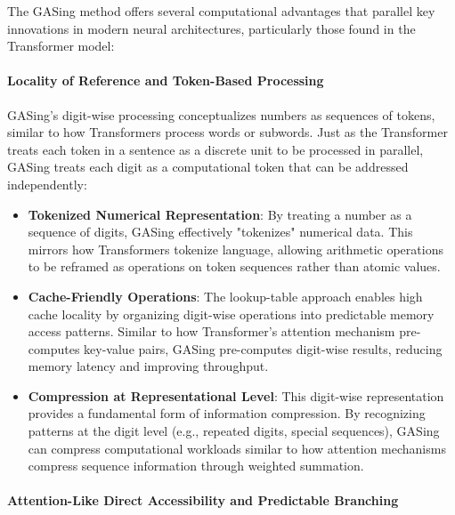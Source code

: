 The GASing method offers several computational advantages that parallel key innovations in modern neural architectures, particularly those found in the Transformer model:
\paragraph{Locality of Reference and Token-Based Processing}

GASing's digit-wise processing conceptualizes numbers as sequences of tokens, similar to how Transformers process words or subwords. Just as the Transformer treats each token in a sentence as a discrete unit to be processed in parallel, GASing treats each digit as a computational token that can be addressed independently:

\begin{itemize}
\item \textbf{Tokenized Numerical Representation}: By treating a number as a sequence of digits, GASing effectively "tokenizes" numerical data. This mirrors how Transformers tokenize language, allowing arithmetic operations to be reframed as operations on token sequences rather than atomic values.
\end{itemize}

\begin{itemize}
\item \textbf{Cache-Friendly Operations}: The lookup-table approach enables high cache locality by organizing digit-wise operations into predictable memory access patterns. Similar to how Transformer's attention mechanism pre-computes key-value pairs, GASing pre-computes digit-wise results, reducing memory latency and improving throughput.
\end{itemize}

\begin{itemize}
\item \textbf{Compression at Representational Level}: This digit-wise representation provides a fundamental form of information compression. By recognizing patterns at the digit level (e.g., repeated digits, special sequences), GASing can compress computational workloads similar to how attention mechanisms compress sequence information through weighted summation.
\end{itemize}
\paragraph{Attention-Like Direct Accessibility and Predictable Branching}

